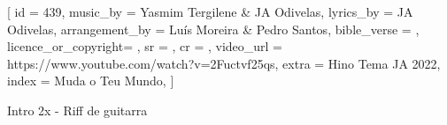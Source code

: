 [
    id                  = {439},
    music_by            = {Yasmim Tergilene & JA Odivelas}, %
    lyrics_by           = {JA Odivelas}, %
    arrangement_by      = {Luís Moreira & Pedro Santos}, %
    bible_verse         = {},
    licence_or_copyright= {},
    sr                  = {},
    cr                  = {},
    video_url           = {https://www.youtube.com/watch?v=2Fuctvf25qs}, 
    extra               = {Hino Tema JA 2022},
    index               = {Muda o Teu Mundo},
]

\beginverse
Intro 2x - Riff de guitarra
\endverse

\beginverse

